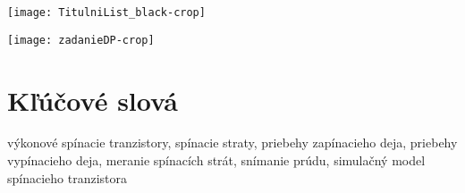 %

\texttt{[image: TitulniList\_black-crop]}

\newpage\thispagestyle{empty}\mbox{}


\newpage

\thispagestyle{empty}
\texttt{[image: zadanieDP-crop]}




\newpage\thispagestyle{empty}\mbox{}

\newpage\thispagestyle{empty}\mbox{}


\newpage
\thispagestyle{empty}
\section*{Kľúčové slová}
výkonové spínacie tranzistory, spínacie straty, priebehy zapínacieho deja, priebehy vypínacieho deja, meranie spínacích strát, snímanie prúdu, simulačný model spínacieho tranzistora
\vspace{30mm}
